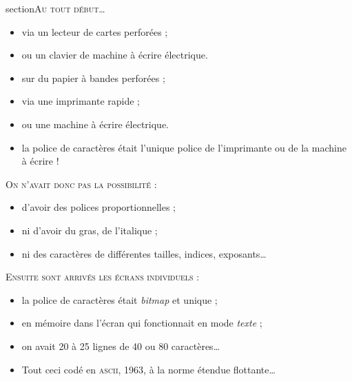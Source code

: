 \documentclass[12pt,a4paper,twocolumn]{book} %
\begin{document}
section{\textsc{Au tout début\dots}}



		\begin{itemize}
			\item<+->  via un lecteur de cartes perforées ;
			\item<+->  ou un clavier de machine à écrire électrique.
		\end{itemize}

	

		\begin{itemize}
			\item<+->  sur du papier à bandes perforées ;
			\item<+->  via une imprimante rapide ;
			\item<+->  ou une machine à écrire électrique.
						\item<+->  la police de caractères était l'unique police de l'imprimante ou de la machine à écrire !
		\end{itemize}
{\textsc{On n'avait donc pas la possibilité :}}
		\begin{itemize}
			\item<+-> d'avoir des polices proportionnelles ;
			\item<+-> ni d'avoir du gras, de l'italique ;
			\item<+-> ni des caractères de différentes tailles, indices, exposants\dots
		\end{itemize}
{\textsc{Ensuite sont arrivés les écrans individuels :}}
		\begin{itemize}
			\item<+-> la police de caractères était \textit{bitmap} et unique ;
			\item<+-> en mémoire dans l'écran qui fonctionnait en mode \textit{texte} ;
			\item<+-> on avait 20 à 25 lignes de 40 ou 80 caractères\dots
			\item<+-> Tout ceci codé en \textsc{ascii}, 1963, à la norme étendue flottante\dots
		\end{itemize}
		
\end{document}
